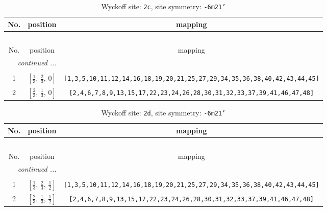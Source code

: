 \documentclass[fleqn,8pt]{jsarticle}
\begin{document}
\renewcommand{\arraystretch}{1.2}
\begin{longtable}{ccc}
\caption{Wyckoff site: {\tt 2c}, site symmetry: {\tt -6m21'}}
 \\
 \hline \hline
No. & position & mapping \\ \hline \endfirsthead

\multicolumn{2}{l}{\tablename\ \thetable{}} \\
 \hline \hline
No. & position & mapping \\ \hline \endhead

 \hline \hline
\multicolumn{2}{r}{\footnotesize\it continued ...} \\ \endfoot

 \hline \hline
\multicolumn{2}{r}{} \\ \endlastfoot

1 & $\left[ \frac{1}{3},\, \frac{2}{3},\, 0 \right]$ & {\tt [1,3,5,10,11,12,14,16,18,19,20,21,25,27,29,34,35,36,38,40,42,43,44,45]} \\ \hline
2 & $\left[ \frac{2}{3},\, \frac{1}{3},\, 0 \right]$ & {\tt [2,4,6,7,8,9,13,15,17,22,23,24,26,28,30,31,32,33,37,39,41,46,47,48]} \\
\end{longtable}
\renewcommand{\arraystretch}{1.2}
\begin{longtable}{ccc}
\caption{Wyckoff site: {\tt 2d}, site symmetry: {\tt -6m21'}}
 \\
 \hline \hline
No. & position & mapping \\ \hline \endfirsthead

\multicolumn{2}{l}{\tablename\ \thetable{}} \\
 \hline \hline
No. & position & mapping \\ \hline \endhead

 \hline \hline
\multicolumn{2}{r}{\footnotesize\it continued ...} \\ \endfoot

 \hline \hline
\multicolumn{2}{r}{} \\ \endlastfoot

1 & $\left[ \frac{1}{3},\, \frac{2}{3},\, \frac{1}{2} \right]$ & {\tt [1,3,5,10,11,12,14,16,18,19,20,21,25,27,29,34,35,36,38,40,42,43,44,45]} \\ \hline
2 & $\left[ \frac{2}{3},\, \frac{1}{3},\, \frac{1}{2} \right]$ & {\tt [2,4,6,7,8,9,13,15,17,22,23,24,26,28,30,31,32,33,37,39,41,46,47,48]} \\
\end{longtable}
\renewcommand{\arraystretch}{1.2}
\end{document}
